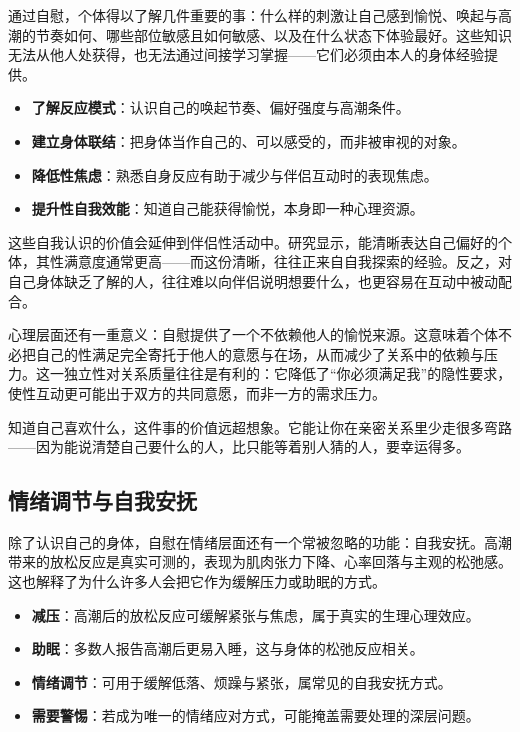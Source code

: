 \documentclass[12pt,UTF8]{ctexbook}
\begin{document}
通过自慰，个体得以了解几件重要的事：什么样的刺激让自己感到愉悦、唤起与高潮的节奏如何、哪些部位敏感且如何敏感、以及在什么状态下体验最好。这些知识无法从他人处获得，也无法通过间接学习掌握——它们必须由本人的身体经验提供。

\begin{itemize}
\item \textbf{了解反应模式}：认识自己的唤起节奏、偏好强度与高潮条件。
\item \textbf{建立身体联结}：把身体当作自己的、可以感受的，而非被审视的对象。
\item \textbf{降低性焦虑}：熟悉自身反应有助于减少与伴侣互动时的表现焦虑。
\item \textbf{提升性自我效能}：知道自己能获得愉悦，本身即一种心理资源。
\end{itemize}

这些自我认识的价值会延伸到伴侣性活动中。研究显示，能清晰表达自己偏好的个体，其性满意度通常更高——而这份清晰，往往正来自自我探索的经验。反之，对自己身体缺乏了解的人，往往难以向伴侣说明想要什么，也更容易在互动中被动配合。

心理层面还有一重意义：自慰提供了一个不依赖他人的愉悦来源。这意味着个体不必把自己的性满足完全寄托于他人的意愿与在场，从而减少了关系中的依赖与压力。这一独立性对关系质量往往是有利的：它降低了“你必须满足我”的隐性要求，使性互动更可能出于双方的共同意愿，而非一方的需求压力。

\begin{tcolorbox}[colback=pink!5!white,colframe=red!50!black,title=贴心小叮咛]
知道自己喜欢什么，这件事的价值远超想象。它能让你在亲密关系里少走很多弯路——因为能说清楚自己要什么的人，比只能等着别人猜的人，要幸运得多。
\end{tcolorbox}

\subsection{情绪调节与自我安抚}

除了认识自己的身体，自慰在情绪层面还有一个常被忽略的功能：自我安抚。高潮带来的放松反应是真实可测的，表现为肌肉张力下降、心率回落与主观的松弛感。这也解释了为什么许多人会把它作为缓解压力或助眠的方式。

\begin{itemize}
\item \textbf{减压}：高潮后的放松反应可缓解紧张与焦虑，属于真实的生理心理效应。
\item \textbf{助眠}：多数人报告高潮后更易入睡，这与身体的松弛反应相关。
\item \textbf{情绪调节}：可用于缓解低落、烦躁与紧张，属常见的自我安抚方式。
\item \textbf{需要警惕}：若成为唯一的情绪应对方式，可能掩盖需要处理的深层问题。
\end{itemize}
\end{document}

